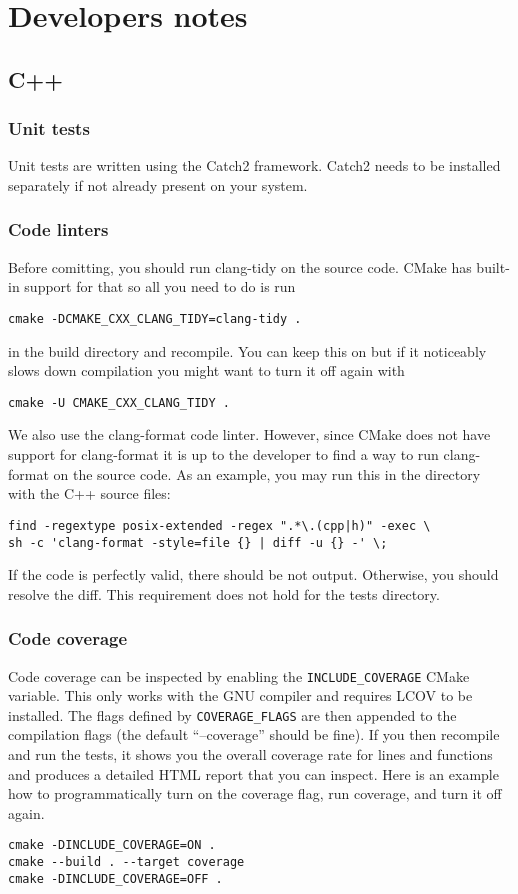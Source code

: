 \documentclass{article}
\begin{document}
\section{Developers notes}

\subsection{C++}

\subsubsection{Unit tests}

Unit tests are written using the Catch2 framework. Catch2 needs to be installed separately if not already present on your system.

\subsubsection{Code linters}

Before comitting, you should run clang-tidy on the source code. CMake has built-in support for that so all you need to do is run
\begin{verbatim}
cmake -DCMAKE_CXX_CLANG_TIDY=clang-tidy .
\end{verbatim}
in the build directory and recompile. You can keep this on but if it noticeably slows down compilation you might want to turn it off again with
\begin{verbatim}
cmake -U CMAKE_CXX_CLANG_TIDY .
\end{verbatim}
We also use the clang-format code linter. However, since CMake does not have support for clang-format it is up to the developer to find a way to run clang-format on the source code. As an example, you may run this in the directory with the C++ source files:
\begin{verbatim}
find -regextype posix-extended -regex ".*\.(cpp|h)" -exec \
sh -c 'clang-format -style=file {} | diff -u {} -' \;
\end{verbatim}
If the code is perfectly valid, there should be not output. Otherwise, you should resolve the diff. This requirement does not hold for the tests directory.

\subsubsection{Code coverage}

Code coverage can be inspected by enabling the \verb+INCLUDE_COVERAGE+ CMake variable. This only works with the GNU compiler and requires LCOV to be installed. The flags defined by \verb+COVERAGE_FLAGS+ are then appended to the compilation flags (the default ``--coverage'' should be fine). If you then recompile and run the tests, it shows you the overall coverage rate for lines and functions and produces a detailed HTML report that you can inspect. Here is an example how to programmatically turn on the coverage flag, run coverage, and turn it off again.
\begin{verbatim}
cmake -DINCLUDE_COVERAGE=ON .
cmake --build . --target coverage
cmake -DINCLUDE_COVERAGE=OFF .
\end{verbatim}
\end{document}
